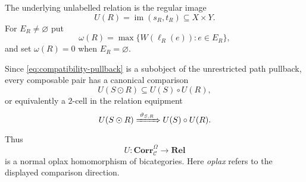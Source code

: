 The underlying unlabelled relation is the regular image
\begin{equation}\label{eq:underlying-relation}
U(R)=\operatorname{im}(s_R,t_R)\subseteq X\times Y.
\end{equation}
For $E_R\ne\varnothing$ put
\[
\omega(R)=\max\{W(\ell_R(e)):e\in E_R\},
\]
and set $\omega(R)=0$ when $E_R=\varnothing$.

Since \eqref{eq:compatibility-pullback} is a subobject of the unrestricted path pullback, every composable pair has a canonical comparison
\begin{equation}\label{eq:oplax-inclusion}
U(S\odot R)\subseteq U(S)\circ U(R),
\end{equation}
or equivalently a $2$-cell in the relation equipment
\begin{equation}\label{eq:oplax-2cell}
U(S\odot R)
\xRightarrow{\;\vartheta_{S,R}\;}
U(S)\circ U(R).
\end{equation}
Thus
\[
U:\mathbf{Corr}_{\mathcal C}^{\Omega}\longrightarrow\mathbf{Rel}
\]
is a normal oplax homomorphism of bicategories.  Here \emph{oplax} refers to the displayed comparison direction.

